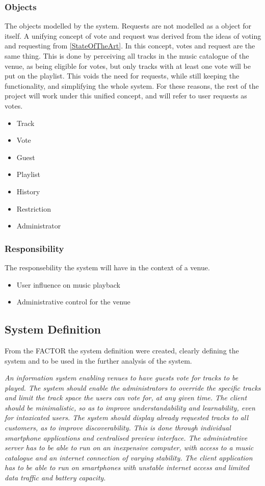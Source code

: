 \subsubsection{Objects}
\label{FACTORObjects}
The objects modelled by the system.
Requests are not modelled as a object for itself. A unifying concept of vote and request was derived from the ideas of voting and requesting from \cref{StateOfTheArt}. In this concept, votes and request are the same thing. This is done by perceiving all tracks in the music catalogue of the venue, as being eligible for votes, but only tracks with at least one vote will be put on the playlist. This voids the need for requests, while still keeping the functionality, and simplifying the whole system. For these reasons, the rest of the project will work under this unified concept, and will refer to user requests as votes.
\begin{itemize}
  \item Track
  \item Vote
  \item Guest
  \item Playlist
  \item History
  \item Restriction
  \item Administrator
\end{itemize}

\subsubsection{Responsibility}
The responsebility the system will have in the context of a venue.
\begin{itemize}
  \item User influence on music playback
  \item Administrative control for the venue
\end{itemize}

\subsection{System Definition}\label{sub:systemDefinition}
From the FACTOR the system definition were created, clearly defining the system and to be used in the further analysis of the system.

\begin{center}
\textit{An information system enabling venues to have guests vote for tracks to be played. The system should enable the administrators to override the specific tracks and limit the track space the users can vote for, at any given time. The client should be minimalistic, so as to improve understandability and learnability, even for intoxicated users. The system should display already requested tracks to all customers, as to improve discoverability. This is done through individual smartphone applications and centralised preview interface.
The administrative server has to be able to run on an inexpensive computer, with access to a music catalogue and an internet connection of varying stability. The client application has to be able to run on smartphones with unstable internet access and limited data traffic and battery capacity.}
\end{center}

